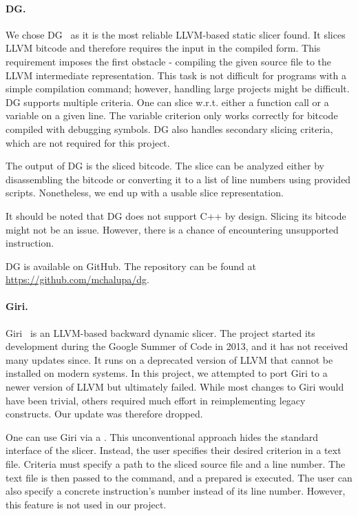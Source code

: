 \paragraph{DG.} We chose DG~\citep{Chalupa20} as it is the most reliable 
LLVM-based static slicer found. 
It slices LLVM bitcode and therefore requires the input in the compiled form. 
This requirement imposes the first obstacle - compiling the given source file 
to the LLVM intermediate representation. 
This task is not difficult for programs with a simple compilation command; 
however, handling large projects might be difficult. 
DG supports multiple criteria. 
One can slice w.r.t. either a function call or a variable on a given line. 
The variable criterion only works correctly for bitcode compiled with 
debugging symbols. 
DG also handles secondary slicing criteria, which are not required for this 
project. 

The output of DG is the sliced bitcode. 
The slice can be analyzed either by disassembling the bitcode or converting 
it to a list of line numbers using provided scripts. 
Nonetheless, we end up with a usable slice representation.

It should be noted that DG does not support C++ by design. 
Slicing its bitcode might not be an issue. 
However, there is a chance of encountering unsupported instruction.

DG is available on GitHub. 
The repository can be found at \url{https://github.com/mchalupa/dg}.

\paragraph{Giri.}

Giri~\citep{Sahoo13} is an LLVM-based backward dynamic slicer. 
The project started its development during the Google Summer of Code in 2013, 
and it has not received many updates since. 
It runs on a deprecated version of LLVM that cannot be installed on modern 
systems. 
In this project, we attempted to port Giri to a newer version of LLVM but 
ultimately failed. 
While most changes to Giri would have been trivial, others required much 
effort in reimplementing legacy constructs. 
Our update was therefore dropped.

One can use Giri via a . 
This unconventional approach hides the standard interface of the slicer. 
Instead, the user specifies their desired criterion in a text file. 
Criteria must specify a path to the sliced source file and a line number. 
The text file is then passed to the  command, and a prepared 
 is executed. 
The user can also specify a concrete instruction's number instead of its 
line number. 
However, this feature is not used in our project.

